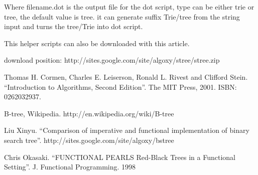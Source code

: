 \documentclass{article}
\begin{document}
Where filename.dot is the output file for the dot script, type can be
either trie or tree, the default value is tree. it can generate suffix
Trie/tree from the string input and turns the tree/Trie into dot script.

This helper scripts can also be downloaded with this article.

download position: http://sites.google.com/site/algoxy/stree/stree.zip

\begin{thebibliography}{99}

Thomas H. Cormen, Charles E. Leiserson, Ronald L. Rivest and Clifford Stein. ``Introduction to Algorithms, Second Edition''. The MIT Press, 2001. ISBN: 0262032937.

B-tree, Wikipedia. http://en.wikipedia.org/wiki/B-tree

Liu Xinyu. ``Comparison of imperative and functional implementation of
binary search tree''. http://sites.google.com/site/algoxy/bstree

Chris Okasaki. ``FUNCTIONAL PEARLS Red-Black Trees in a Functional Setting''. J. Functional Programming. 1998

\end{thebibliography}

\ifx\wholebook\relax \else
\end{document}
